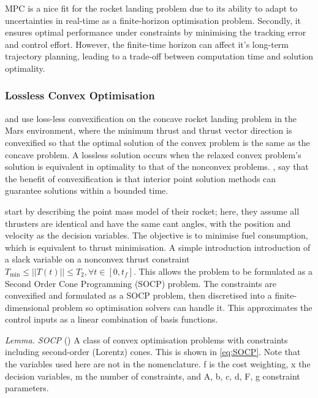 MPC is a nice fit for the rocket landing problem due to its ability to adapt to uncertainties in real-time as a finite-horizon optimisation problem. Secondly, it ensures optimal performance under constraints by minimising the tracking error and control effort. However, the finite-time horizon can affect it's long-term trajectory planning, leading to a trade-off between computation time and solution optimality.

\subsubsection{Lossless Convex Optimisation}
\label{sec:convex_optimisation}


\cite{Acikmese2007} and \cite{Acikmese2013} use loss-less convexification on the concave rocket landing problem in the Mars environment, where the minimum thrust and thrust vector direction is convexified so that the optimal solution of the convex problem is the same as the concave problem. A lossless solution occurs when the relaxed convex problem's solution is equivalent in optimality to that of the nonconvex problems. \cite{Gaudet2018}, say that the benefit of convexification is that interior point solution methods can guarantee solutions within a bounded time.

\cite{Acikmese2007} start by describing the point mass model of their rocket; here, they assume all thrusters are identical and have the same cant angles, with the position and velocity as the decision variables. The objective is to minimise fuel consumption, which is equivalent to thrust minimisation. A simple introduction introduction of a slack variable on a nonconvex thrust constraint \(T_{\text{min}} \leq ||T(t)|| \leq T_2, \forall t \in [0, t_f]\). This allows the problem to be formulated as a Second Order Cone Programming (SOCP) problem. The constraints are convexified and formulated as a SOCP problem, then discretised into a finite-dimensional problem so optimisation solvers can handle it. This approximates the control inputs as a linear combination of basis functions.

\textit{Lemma. SOCP} (\cite{boyd2003socp})
A class of convex optimisation problems with constraints including second-order (Lorentz) cones. This is shown in \autoref{eq:SOCP}. Note that the variables used here are not in the nomenclature. f is the cost weighting, x the decision variables, m the number of constraints, and A, b, c, d, F, g constraint parameters. 

